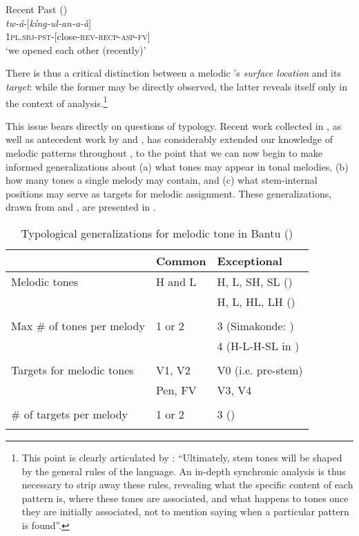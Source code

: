 \documentclass[output=paper,newtxmath,modfonts,nonflat,hidelinks]{langsci/langscibook}
\begin{document}
\ea\label{ex:jones:2}
Recent Past ()\\
\gll \textit{tw-á}-[\textit{kíng-ul-an-a-à}] \\
\textsc{1pl.sbj-pst-[}close\textsc{-rev-recp-asp-fv]}\\
\glt ‘we opened each other (recently)’
\z

\newpage 
\noindent 
There is thus a critical distinction between a melodic ’s \textit{surface location} and its \textit{target}: while the former may be directly observed, the latter reveals itself only in the context of analysis.\footnote{This point is clearly articulated by \citet[5]{Bickmore2014}: “Ultimately, stem tones will be shaped by the general rules of the language. An in-depth synchronic analysis is thus necessary to strip away these rules, revealing what the specific content of each pattern is, where these tones are associated, and what happens to tones once they are initially associated, not to mention saying when a particular pattern is found”.}

This issue bears directly on questions of typology. Recent work collected in  \citet{Bickmore2014}, as well as antecedent work by \citet{Kisseberth&Odden2003} and \citet{Marlo2013}, has considerably extended our knowledge of melodic  patterns throughout , to the point that we can now begin to make informed generalizations about (a) what tones may appear in tonal melodies, (b) how many tones a single melody may contain, and (c) what stem-internal positions may serve as targets for melodic assignment. These generalizations, drawn from \citet{Bickmore2014} and \citet{Bickmore2015}, are presented in .

\begin{table}
\begin{tabularx}{\textwidth}{lQl}
\lsptoprule
	&  Common  &  Exceptional\\
\midrule
{Melodic tones} 	& H and L &  {H, L, SH, SL ()}  \\
					& 		  &   H, L, HL, LH  ()\\
                    & & \\
 Max \# of tones per melody & 1 or 2 & {3 (Simakonde: \citealt{Manus2014})}\\
 &  & 4 (H-L-H-SL in )\\
 & & \\
{Targets for melodic tones} & {V1,  V2}  & {V0 (i.e. pre-stem)}\\
  & Pen, FV   & V3,  V4\\
& & \\
{ \# of targets per melody} & 1 or 2 & 3 ()\\
\lspbottomrule 
\end{tabularx}
\caption{Typological generalizations for melodic tone in Bantu (\citealt{Bickmore2014,Bickmore2015}) }
\label{tab:jones:1}
\end{table}
\end{document}

